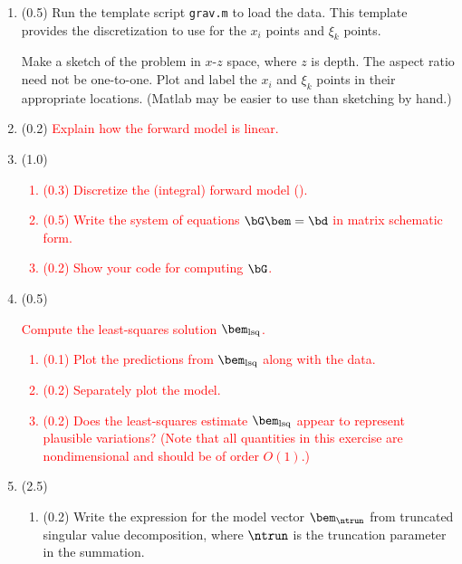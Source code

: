 \documentclass[11pt,titlepage,fleqn]{article}
\newcommand{\mv}{\xi}  %
\newcommand{\dv}{x}  %
\begin{document}
\begin{enumerate}
\item (0.5) Run the template script \verb+grav.m+ to load the data. This template provides the discretization to use for the $\dv_i$ points and $\mv_k$ points.

Make a sketch of the problem in $x$-$z$ space, where $z$ is depth. The aspect ratio need not be one-to-one. Plot and label the $\dv_i$ and $\mv_k$ points in their appropriate locations. (Matlab may be easier to use than sketching by hand.)


\item (0.2) \textcolor{red}{Explain how the forward model is linear.}
\label{prob1}


\item (1.0)
\textcolor{red}{
\begin{enumerate}
\item (0.3) Discretize the (integral) forward model ().
\item (0.5) Write the system of equations $\bG\bem = \bd$ in matrix schematic form.
\item (0.2) Show your code for computing $\bG$.
\end{enumerate}
}


\item (0.5) 
\textcolor{red}{
Compute the least-squares solution $\bem_{\rm lsq}$.
\begin{enumerate}
\item (0.1) Plot the predictions from $\bem_{\rm lsq}$ along with the data.
\item (0.2) Separately plot the model.
\item (0.2) Does the least-squares estimate $\bem_{\rm lsq}$ appear to represent plausible variations? (Note that all quantities in this exercise are nondimensional and should be of order $O(1)$.)
\end{enumerate}
}


\item (2.5)

\begin{enumerate}
\item (0.2) Write the expression for the model vector $\bem_{\ntrun}$ from truncated singular value decomposition, where $\ntrun$ is the truncation parameter in the summation.


\end{enumerate}
\end{enumerate}
\end{document}
